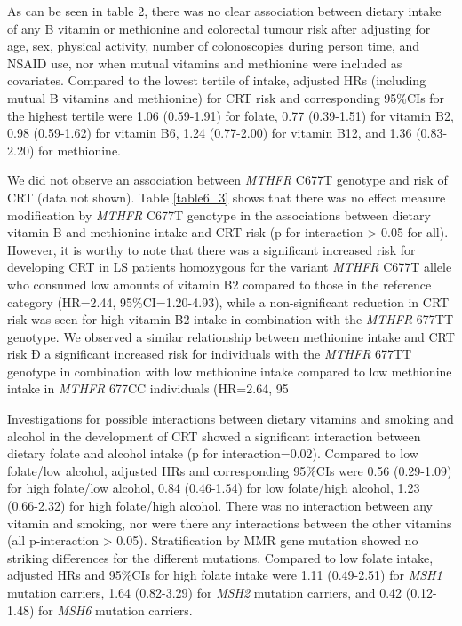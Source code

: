 \noindent As can be seen in table 2, there was no clear association between dietary intake of any B vitamin or methionine and colorectal tumour risk after adjusting for age, sex, physical activity, number of colonoscopies during person time, and NSAID use, nor when mutual vitamins and methionine were included as covariates. Compared to the lowest tertile of intake, adjusted HRs (including mutual B vitamins and methionine) for CRT risk and corresponding 95\%CIs for the highest tertile were 1.06 (0.59-1.91) for folate, 0.77 (0.39-1.51) for vitamin B2, 0.98 (0.59-1.62) for vitamin B6, 1.24 (0.77-2.00) for vitamin B12, and 1.36 (0.83-2.20) for methionine.

\noindent We did not observe an association between \emph{MTHFR} C677T genotype and risk of CRT (data not shown). Table \ref{table6_3} shows that there was no effect measure modification by \emph{MTHFR} C677T genotype in the associations between dietary vitamin B and methionine intake and CRT risk (p for interaction > 0.05 for all). However, it is worthy to note that there was a significant increased risk for developing CRT in LS patients homozygous for the variant \emph{MTHFR} C677T allele who consumed low amounts of vitamin B2 compared to those in the reference category (HR=2.44, 95\%CI=1.20-4.93), while a non-significant reduction in CRT risk was seen for high vitamin B2 intake in combination with the \emph{MTHFR} 677TT genotype. We observed a similar relationship between methionine intake and CRT risk Ð a significant increased risk for individuals with the \emph{MTHFR} 677TT genotype in combination with low methionine intake compared to low methionine intake in \emph{MTHFR} 677CC individuals (HR=2.64, 95\

\noindent Investigations for possible interactions between dietary vitamins and smoking and alcohol in the development of CRT showed a significant interaction between dietary folate and alcohol intake (p for interaction=0.02). Compared to low folate/low alcohol, adjusted HRs and corresponding 95\%CIs were 0.56 (0.29-1.09) for high folate/low alcohol, 0.84 (0.46-1.54) for low folate/high alcohol, 1.23 (0.66-2.32) for high folate/high alcohol. There was no interaction between any vitamin and smoking, nor were there any interactions between the other vitamins (all p-interaction > 0.05). Stratification by MMR gene mutation showed no striking differences for the different mutations. Compared to low folate intake, adjusted HRs and 95\%CIs for high folate intake were 1.11 (0.49-2.51) for \emph{MSH1} mutation carriers, 1.64 (0.82-3.29) for \emph{MSH2} mutation carriers, and 0.42 (0.12-1.48) for \emph{MSH6} mutation carriers.

